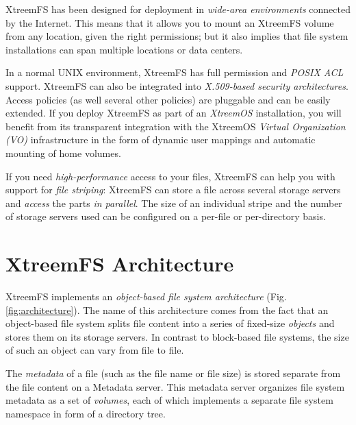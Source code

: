 \documentclass[a4paper,10pt]{book}
\begin{document}
XtreemFS has been designed for deployment in \emph{wide-area environments} connected by the Internet. This means that it allows you to mount an XtreemFS volume from any location, given the right permissions; but it also implies that file system installations can span multiple locations or data centers.

In a normal UNIX environment, XtreemFS has full permission and \emph{POSIX ACL} support. XtreemFS can also be integrated into \emph{X.509-based security architectures}. Access policies (as well several other policies) are pluggable and can be easily extended. If you deploy XtreemFS as part of an \emph{XtreemOS} installation, you will benefit from its transparent integration with the XtreemOS \emph{Virtual Organization (VO)} infrastructure in the form of dynamic user mappings and automatic mounting of home volumes.

If you need \emph{high-performance} access to your files, XtreemFS can help you with support for \emph{file striping}: XtreemFS can store a file across several storage servers and \emph{access} the parts \emph{in parallel}. The size of an individual stripe and the number of storage servers used can be configured on a per-file or per-directory basis.


\section{XtreemFS Architecture}

XtreemFS implements an \emph{object-based file system architecture} (Fig. \ref{fig:architecture}). The name of this architecture comes from the fact that an object-based file system splits file content into a series of fixed-size \emph{objects} and stores them on its storage servers. In contrast to block-based file systems, the size of such an object can vary from file to file.

The \emph{metadata} of a file (such as the file name or file size) is stored separate from the file content on a Metadata server. This metadata server organizes file system metadata as a set of \emph{volumes}, each of which implements a separate file system namespace in form of a directory tree.

\end{document}
